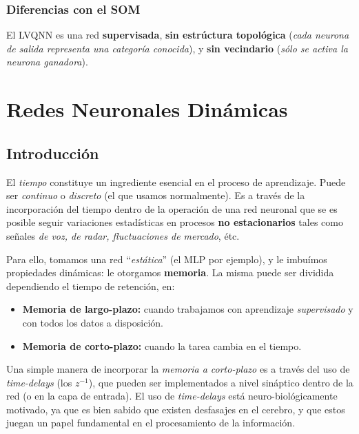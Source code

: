 \documentclass[10pt,a4paper]{article}
\begin{document}
\subsubsection{Diferencias con el SOM}

El LVQNN es una red \textbf{supervisada}, \textbf{sin estrúctura topológica} (\textit{cada neurona de salida representa una categoría conocida}), y \textbf{sin vecindario} (\textit{sólo se activa la neurona ganadora}).


\section{Redes Neuronales Dinámicas}

\subsection{Introducción}

El \textit{tiempo} constituye un ingrediente esencial en el proceso de aprendizaje. Puede ser \textit{continuo} o \textit{discreto} (el que usamos normalmente). Es a través de la incorporación del tiempo dentro de la operación de una red neuronal que se es posible seguir variaciones estadísticas en procesos \textbf{no estacionarios} tales como señales \textit{de voz, de radar, fluctuaciones de mercado}, étc.

Para ello, tomamos una red ``\textit{estática}'' (el MLP por ejemplo), y le imbuímos propiedades dinámicas: le otorgamos \textbf{memoria}. La misma puede ser dividida dependiendo el tiempo de retención, en:
\begin{itemize}
\item \textbf{Memoria de largo-plazo:} cuando trabajamos con aprendizaje \textit{supervisado} y con todos los datos a disposición.
\item \textbf{Memoria de corto-plazo:} cuando la tarea cambia en el tiempo.
\end{itemize}

Una simple manera de incorporar la \textit{memoria a corto-plazo} es a través del uso de \textit{time-delays} (los $z^{-1}$), que pueden ser implementados a nivel sináptico dentro de la red (o en la capa de entrada). El uso de \textit{time-delays} está neuro-biológicamente motivado, ya que es bien sabido que existen desfasajes en el cerebro, y que estos juegan un papel fundamental en el procesamiento de la información.
\end{document}

